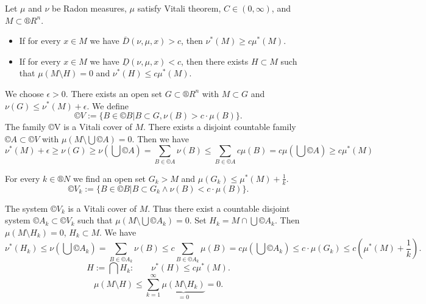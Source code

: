\documentclass[12pt]{article}					%
\begin{document}
\begin{veta}
	Let $\mu$ and $\nu$ be Radon measures, $\mu$ satisfy Vitali theorem, $C \in (0, ∞)$, and $M \subset ®R^n$.
	\begin{itemize}
		\item If for every $x \in M$ we have $\overline{D}(\nu, \mu, x) > c$, then $\nu^*(M) ≥ c \mu^*(M)$.
		\item If for every $x \in M$ we have $\underline{D}(\nu, \mu, x) < c$, then there exists $H \subset M$ such that $\mu(M \setminus H) = 0$ and $\nu^*(H) ≤ c \mu^*(M)$.
	\end{itemize}
	
	\begin{dukazin}[1.]
		We choose $\epsilon > 0$. There exists an open set $G \subset ®R^n$ with $M \subset G$ and $\nu(G) ≤ \nu^*(M) + \epsilon$. We define
		$$ ©V := \{B \in ©B | B \subset G, \nu(B) > c·\mu(B)\}. $$
		The family ©V is a Vitali cover of $M$. There exists a disjoint countable family $©A \subset ©V$ with $\mu(M \setminus \bigcup ©A) = 0$. Then we have
		$$ \nu^*(M) + \epsilon ≥ \nu(G) ≥ \nu(\bigcup ©A) = \sum_{B \in ©A} \nu(B) ≤ \sum_{B \in ©A} c \mu(B) = c \mu(\bigcup ©A) ≥ c \mu^*(M) $$
	\end{dukazin}


	\begin{dukazin}[2.]
		For every $k \in ®N$ we find an open set $G_k > M$ and $\mu(G_k) ≤ \mu^*(M) + \frac{1}{k}$.
		$$ ©V_k := \{B \in ©B | B \subset G_k \land \nu(B) < c·\mu(B)\}. $$

		The system $©V_k$ is a Vitali cover of $M$. Thus there exist a countable disjoint system $©A_k \subset ©V_k$ such that $\mu(M \setminus \bigcup ©A_k) = 0$. Set $H_k = M \cap \bigcup ©A_k$. Then $\mu(M \setminus H_k) = 0$, $H_k \subset M$. We have
		$$ \nu^*(H_k) ≤ \nu(\bigcup ©A_k) = \sum_{B \in ©A_k} \nu(B) ≤ c \sum_{B \in ©A_k} \mu(B) = c \mu(\bigcup ©A_k) ≤ c·\mu(G_k) ≤ c(\mu^*(M) + \frac{1}{k}). $$
		$$ H := \bigcap H_k: \qquad \nu^*(H) ≤ c\mu^*(M). $$
		$$ \mu(M \setminus H) ≤ \sum_{k=1}^∞ \underbrace{\mu(M \setminus H_k)}_{=0} = 0. $$
	\end{dukazin}
\end{veta}
\end{document}
